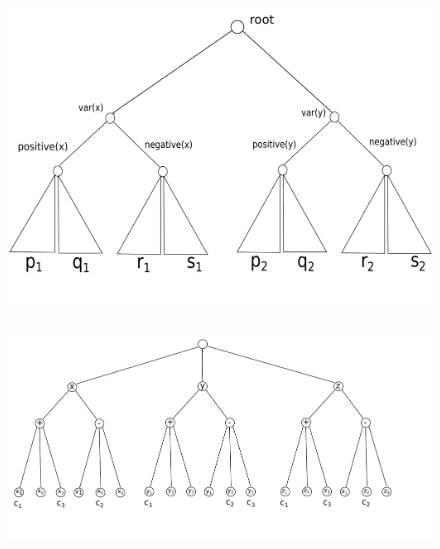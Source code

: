 \begin{figure}[htbp]
\includegraphics[width = \columnwidth]{figs/lemma-two-gadgets.pdf}
\end{figure}


\begin{figure}[htbp]
\includegraphics[width = \columnwidth]{figs/formula-example.pdf}
\end{figure}



